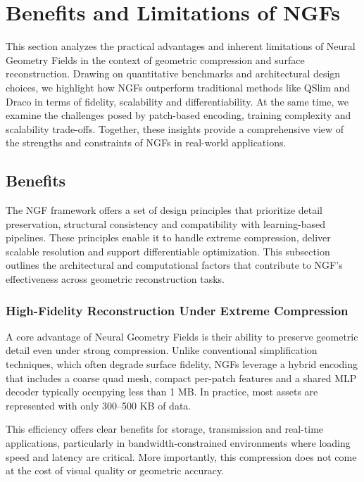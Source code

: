 \section{Benefits and Limitations of NGFs}\label{Sec:Evaluation}

This section analyzes the practical advantages and inherent limitations of Neural Geometry Fields in the context of geometric compression and surface reconstruction. 
Drawing on quantitative benchmarks and architectural design choices, we highlight how NGFs outperform traditional methods like QSlim and Draco in terms of fidelity, scalability and differentiability. 
At the same time, we examine the challenges posed by patch-based encoding, training complexity and scalability trade-offs. 
Together, these insights provide a comprehensive view of the strengths and constraints of NGFs in real-world applications.


\subsection{Benefits}

The NGF framework offers a set of design principles that prioritize detail preservation, structural consistency and compatibility with learning-based pipelines. 
These principles enable it to handle extreme compression, deliver scalable resolution and support differentiable optimization. 
This subsection outlines the architectural and computational factors that contribute to NGF's effectiveness across geometric reconstruction tasks.

\subsubsection{High-Fidelity Reconstruction Under Extreme Compression}

A core advantage of Neural Geometry Fields is their ability to preserve geometric detail even under strong compression. 
Unlike conventional simplification techniques, which often degrade surface fidelity, NGFs leverage a hybrid encoding that includes a coarse quad mesh, compact per-patch features and a shared MLP decoder typically occupying less than 1 MB. 
In practice, most assets are represented with only 300--500 KB of data. 

This efficiency offers clear benefits for storage, transmission and real-time applications, particularly in bandwidth-constrained environments where loading speed and latency are critical. 
More importantly, this compression does not come at the cost of visual quality or geometric accuracy. 

